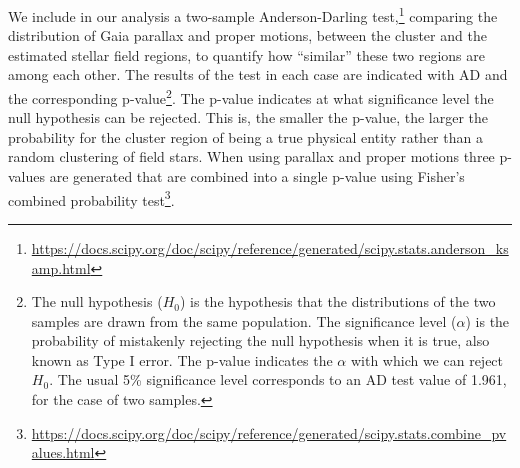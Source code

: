 \documentclass[draft]{aa}
\begin{document}
We include in our analysis a two-sample Anderson-Darling
test,\footnote{\url{https://docs.scipy.org/doc/scipy/reference/generated/scipy.stats.anderson_ksamp.html}}
comparing the distribution of Gaia parallax and proper motions,
between the cluster and the estimated stellar field regions, to quantify how
``similar'' these two regions are among each other.
The results of the test in each case are indicated with AD and the
corresponding p-value\footnote{The null hypothesis ($H_{0}$) is the
hypothesis that the distributions of the two samples are drawn from the same
population. The significance level ($\alpha$) is the probability of mistakenly
rejecting the null hypothesis when it is true, also known as Type I error. The
p-value indicates the $\alpha$ with which we can reject $H_{0}$. The usual 5\%
significance level corresponds to an AD test value of 1.961, for the case of two
samples.}. The p-value indicates at what significance level the null hypothesis
can be rejected. This is, the smaller the p-value, the larger the probability
for the cluster region of being a true physical entity rather than a random
clustering of field stars. When using parallax and proper motions three
p-values are generated that are combined into a single p-value using Fisher's
combined probability
test\footnote{\url{https://docs.scipy.org/doc/scipy/reference/generated/scipy.stats.combine_pvalues.html}}.









\end{document}
